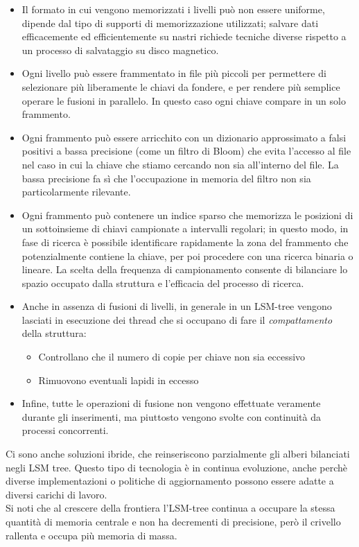 \begin{itemize}
    \item Il formato in cui vengono memorizzati i livelli può non essere uniforme, dipende dal tipo di supporti di memorizzazione utilizzati; salvare dati efficacemente ed efficientemente su nastri richiede tecniche diverse rispetto a un processo di salvataggio su disco magnetico.
    \item Ogni livello può essere frammentato in file più piccoli per permettere di selezionare più liberamente le chiavi da fondere, e per rendere più semplice operare le fusioni in parallelo. In questo caso ogni chiave compare in un solo frammento.
    \item Ogni frammento può essere arricchito con un dizionario approssimato a falsi positivi a bassa precisione (come un filtro di Bloom) che evita l'accesso al file nel caso in cui la chiave che stiamo cercando non sia all'interno del file. La bassa precisione fa sì che l'occupazione in memoria del filtro non sia particolarmente rilevante.
    \item Ogni frammento può contenere un indice sparso che memorizza le posizioni di un sottoinsieme di chiavi campionate a intervalli regolari; in questo modo, in fase di ricerca è possibile identificare rapidamente la zona del frammento che potenzialmente contiene la chiave, per poi procedere con una ricerca binaria o lineare. La scelta della frequenza di campionamento consente di bilanciare lo spazio occupato dalla struttura e l'efficacia del processo di ricerca.
    \item Anche in assenza di fusioni di livelli, in generale in un LSM-tree vengono lasciati in esecuzione dei thread che si occupano di fare il \textit{compattamento} della struttura:
    \begin{itemize}
        \item Controllano che il numero di copie per chiave non sia eccessivo
        \item Rimuovono eventuali lapidi in eccesso
    \end{itemize}
    \item Infine, tutte le operazioni di fusione non vengono effettuate veramente durante gli inserimenti, ma piuttosto vengono svolte con continuità da processi concorrenti.
\end{itemize}
Ci sono anche soluzioni ibride, che reinseriscono parzialmente gli alberi bilanciati negli LSM tree. Questo tipo di tecnologia è in continua evoluzione, anche perchè diverse implementazioni o politiche di aggiornamento possono essere adatte a diversi carichi di lavoro.\\
Si noti che al crescere della frontiera l'LSM-tree continua a occupare la stessa quantità di memoria centrale e non ha decrementi di precisione, però il crivello rallenta e occupa più memoria di massa.
